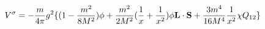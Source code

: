 \begin{equation}
V^{\sigma} = -\frac{m}{4 \pi} g^{2} \{ (1-\frac{m^{2}}{8 M^{2}}) \phi
+ \frac{m^{2}}{2 M^{2}}
(\frac{1}{x}+ \frac{1}{x^{2}}) \phi {\bf L} \cdot {\bf S} +
\frac{3 m^{4}}{16 M^{4}} \frac{1}{x^{2}} \chi Q_{12} \}
\end{equation}

